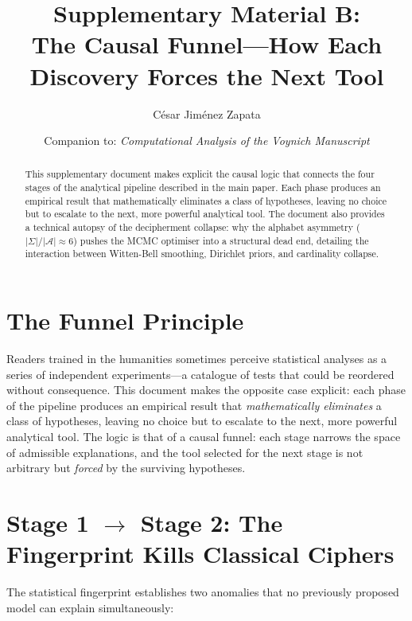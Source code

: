 \documentclass[11pt,a4paper]{article}
\title{Supplementary Material B:\\The Causal Funnel---How Each Discovery Forces the Next Tool}
\author{C\'esar Jim\'enez Zapata}
\date{Companion to: \textit{Computational Analysis of the Voynich Manuscript}}
\begin{document}
\maketitle

\begin{abstract}
This supplementary document makes explicit the causal logic that connects the four stages of the analytical pipeline described in the main paper.  Each phase produces an empirical result that mathematically eliminates a class of hypotheses, leaving no choice but to escalate to the next, more powerful analytical tool.  The document also provides a technical autopsy of the decipherment collapse: why the alphabet asymmetry ($|\Sigma|/|\mathcal{A}| \approx 6$) pushes the MCMC optimiser into a structural dead end, detailing the interaction between Witten-Bell smoothing, Dirichlet priors, and cardinality collapse.
\end{abstract}

\tableofcontents
\bigskip

\section{The Funnel Principle}

Readers trained in the humanities sometimes perceive statistical analyses as a series of independent experiments---a catalogue of tests that could be reordered without consequence.  This document makes the opposite case explicit: each phase of the pipeline produces an empirical result that \emph{mathematically eliminates} a class of hypotheses, leaving no choice but to escalate to the next, more powerful analytical tool.  The logic is that of a causal funnel: each stage narrows the space of admissible explanations, and the tool selected for the next stage is not arbitrary but \emph{forced} by the surviving hypotheses.


\section{Stage 1 $\to$ Stage 2: The Fingerprint Kills Classical Ciphers}

The statistical fingerprint establishes two anomalies that no previously proposed model can explain simultaneously:
\end{document}
